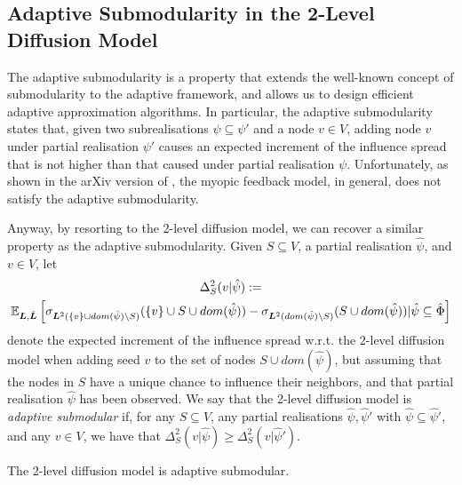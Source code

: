 \subsection{Adaptive Submodularity in the 2-Level Diffusion Model}\label{sub1} The adaptive submodularity \cite{Golovin2011a} is a property that extends  the well-known concept of submodularity to the adaptive framework, and allows us to design efficient adaptive approximation algorithms. In particular, the adaptive submodularity states that, given two subrealisations $\psi\subseteq \psi'$ and a node $v\in V$, adding node $v$ under partial realisation $\psi'$ causes an expected increment of the influence spread that is not higher than that caused under partial realisation $\psi$. Unfortunately, as shown in  the arXiv version of \cite{Golovin2011a}, the myopic feedback model, in general, does not satisfy the adaptive submodularity. 

Anyway, by resorting to the 2-level diffusion model, we can recover a similar property as the adaptive submodularity. Given $S\subseteq V$, a partial realisation $\hat{\psi}$, and $v\in V$, let 
\begin{multline*}
{\Delta}^2_{S}(v|\hat{\psi}):=\nonumber\\
\mathbb{E}_{\bm L,\hat{\bm L}}\left[\sigma_{\bm L^2(\{v\}\cup dom(\hat{\psi})\setminus S)}(\{v\}\cup S\cup dom(\hat{\psi}))-\sigma_{\bm L^2(dom(\hat{\psi})\setminus S)}(S\cup dom(\hat{\psi}))|\hat{\psi}\subseteq \hat{\Phi}\right]
\end{multline*}
denote the expected increment of the influence spread w.r.t. the $2$-level diffusion model when adding seed $v$ to the set of nodes $S\cup dom(\hat{\psi})$, but assuming that the nodes in $S$ have a unique chance to influence their neighbors, and that partial realisation $\hat{\psi}$ has been observed. We say that the 2-level diffusion model is {\em adaptive submodular} if, for any $S\subseteq V$, any partial realisations $\hat{\psi},\hat{\psi}'$ with $\hat{\psi}\subseteq \hat{\psi}'$, and any $v\in V$, we have that $\Delta^2_S(v|\hat{\psi})\geq {\Delta}^2_S(v|\hat{\psi}')$.
\begin{lemma}\label{cla3}
The 2-level diffusion model is adaptive submodular. 
\end{lemma}

